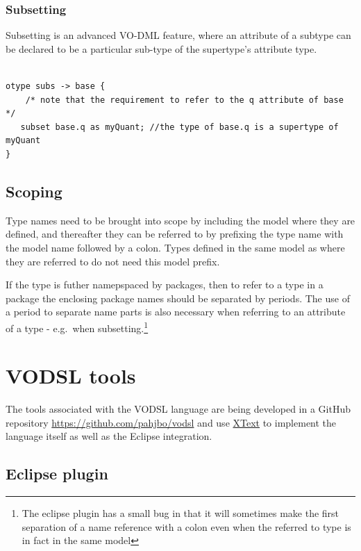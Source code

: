 \documentclass[11pt,a4paper]{ivoa}
\begin{document}
\subsubsection{Subsetting}
Subsetting is an advanced VO-DML feature, where an attribute of a subtype can be declared to be a particular sub-type of the supertype's attribute type.
\begin{lstlisting}[language=vodsl]

otype subs -> base {
	/* note that the requirement to refer to the q attribute of base */
   subset base.q as myQuant; //the type of base.q is a supertype of myQuant
}
\end{lstlisting}



\subsection{Scoping}

Type names need to be brought into scope by including the model where they are defined, and thereafter they can be referred to by prefixing the type name with
the model name followed by a colon. Types defined in the same model as where they are referred to do not need this model prefix.

If the type is futher namepspaced by packages, then to refer to a type in a package the enclosing package names should be separated by periods. The use of a period to separate name parts
is also necessary when referring to an attribute of a type - e.g.\ when subsetting.\footnote{The eclipse plugin has a small bug in that it will sometimes make the first separation of a name
reference with a colon even when the referred to type is in fact in the same model}

\section{VODSL tools}
The tools associated with the VODSL language are being developed in a GitHub repository \url{https://github.com/pahjbo/vodsl} and use \href{https://eclipse.org/Xtext}{XText}
to implement the language itself as well as the Eclipse integration. 

\subsection{Eclipse plugin}
\end{document}
